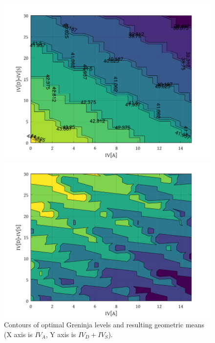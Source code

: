 \begin{figure}[ht]
\begin{minipage}{0.5\textwidth}\begin{center}
\includegraphics[width=\textwidth,keepaspectratio]{octave/greninjalevels.png}
\end{center}\end{minipage}%
\begin{minipage}{0.5\textwidth}\begin{center}
\includegraphics[width=\textwidth,keepaspectratio]{octave/greninjagmeans.png}
\end{center}\end{minipage}%
\caption[Contours of optimal Greninja levels]{Contours of optimal Greninja levels and resulting geometric means
  (X axis is $IV_A$, Y axis is $IV_D + IV_S$).\label{fig:contours}}
\end{figure}
